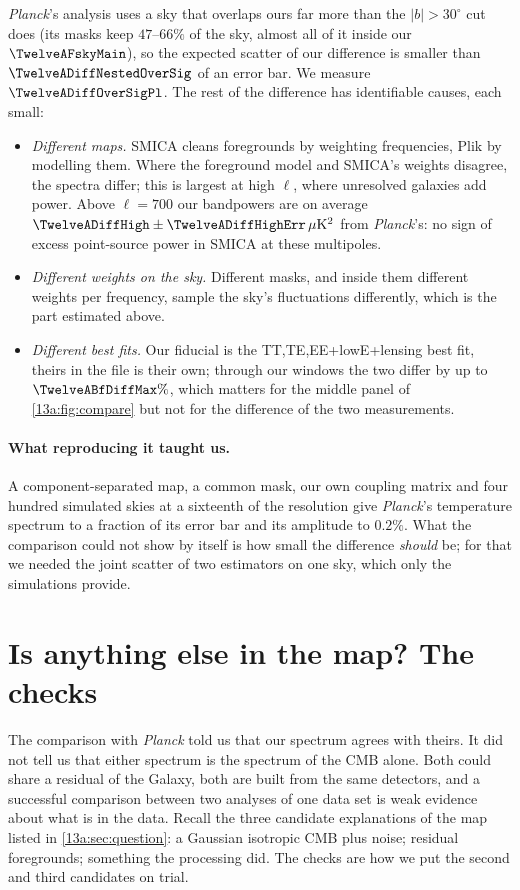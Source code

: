 \textit{Planck}'s analysis uses a sky that overlaps ours far more than the $|b|>30^\circ$ cut does (its masks keep
$47$--$66\%$ of the sky, almost all of it inside our $\TwelveAFskyMain$), so the expected scatter of
our difference is smaller than $\TwelveADiffNestedOverSig$ of an error bar. We measure $\TwelveADiffOverSigPl$. The rest of
the difference has identifiable causes, each small:
\begin{itemize}[itemsep=2pt]
  \item \emph{Different maps.} SMICA cleans foregrounds by weighting frequencies, Plik by modelling them. Where the
        foreground model and SMICA's weights disagree, the spectra differ; this is largest at high $\ell$, where
        unresolved galaxies add power. Above $\ell=700$ our bandpowers are on average $\TwelveADiffHigh\pm\TwelveADiffHighErr\,\mu{\rm K}^2$
        from \textit{Planck}'s: no sign of excess point-source power in SMICA at these multipoles.
  \item \emph{Different weights on the sky.} Different masks, and inside them different weights per frequency, sample the
        sky's fluctuations differently, which is the part estimated above.
  \item \emph{Different best fits.} Our fiducial is the TT,TE,EE+lowE+lensing best fit, theirs in the file is
        their own; through our windows the two differ by up to $\TwelveABfDiffMax\%$, which matters for the middle panel of
        \cref{13a:fig:compare} but not for the difference of the two measurements.
\end{itemize}

\paragraph{What reproducing it taught us.} A component-separated map, a common mask, our own coupling
matrix and four hundred simulated skies at a sixteenth of the resolution give \textit{Planck}'s temperature spectrum to a
fraction of its error bar and its amplitude to $0.2\%$. What the comparison could not show by itself is how small the
difference \emph{should} be; for that we needed the joint scatter of two estimators on one sky, which only the
simulations provide.
\section{Is anything else in the map? The checks}
\label{13a:sec:checks}

The comparison with \textit{Planck} told us that our spectrum agrees with theirs. It did not tell us that
either spectrum is the spectrum of the CMB alone. Both could share a residual of the Galaxy, both are built
from the same detectors, and a successful comparison between two analyses of one data set is weak evidence
about what is in the data. Recall the three candidate explanations of the map listed in
\cref{13a:sec:question}: a Gaussian isotropic CMB plus noise; residual foregrounds; something the processing
did. The checks are how we put the second and third candidates on trial.

